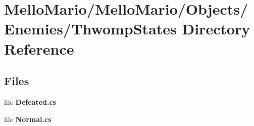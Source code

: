 \section{Mello\+Mario/\+Mello\+Mario/\+Objects/\+Enemies/\+Thwomp\+States Directory Reference}
\label{dir_f269b696981ecf66d2bf225aa5c4bf97}
\subsection*{Files}
\begin{DoxyCompactItemize}
\item 
file \textbf{ Defeated.\+cs}
\item 
file \textbf{ Normal.\+cs}
\end{DoxyCompactItemize}
